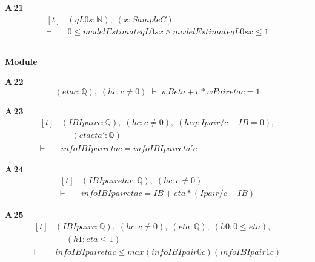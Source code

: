 \noindent\textbf{A\,21}\quad{}
{\footnotesize\[ \begin{aligned}[t]
&(\mathit{q} \mathit{L0} \mathit{s} : \mathbb{N} ),\; (\mathit{x} : \mathit{Sample} \mathit{C})\\
\vdash\;&0 \leq \mathit{modelEstimate} \mathit{q} \mathit{L0} \mathit{s} \mathit{x} \wedge \mathit{modelEstimate} \mathit{q} \mathit{L0} \mathit{s} \mathit{x} \leq 1
\end{aligned} \]}

\vspace{4pt}\noindent\rule{\columnwidth}{0.4pt}\par\vspace{2pt}
\noindent\textbf{Module }\par\vspace{3pt}

\noindent\textbf{A\,22}\quad{}
{\footnotesize\[ (\mathit{eta} \mathit{c} : \mathbb{Q} ),\; (\mathit{hc} : \mathit{c} \neq 0) \;\vdash\; \mathit{wB} \mathit{eta} + \mathit{c} * \mathit{wPair} \mathit{eta} \mathit{c} = 1 \]}

\noindent\textbf{A\,23}\quad{}
{\footnotesize\[ \begin{aligned}[t]
&(\mathit{IB} \mathit{Ipair} \mathit{c} : \mathbb{Q} ),\; (\mathit{hc} : \mathit{c} \neq 0),\; (\mathit{heq} : \mathit{Ipair} / \mathit{c} - \mathit{IB} = 0),\\
&\quad \; (\mathit{eta} \mathit{eta'} : \mathbb{Q} )\\
\vdash\;&\mathit{info} \mathit{IB} \mathit{Ipair} \mathit{eta} \mathit{c} = \mathit{info} \mathit{IB} \mathit{Ipair} \mathit{eta'} \mathit{c}
\end{aligned} \]}

\noindent\textbf{A\,24}\quad{}
{\footnotesize\[ \begin{aligned}[t]
&(\mathit{IB} \mathit{Ipair} \mathit{eta} \mathit{c} : \mathbb{Q} ),\; (\mathit{hc} : \mathit{c} \neq 0)\\
\vdash\;&\mathit{info} \mathit{IB} \mathit{Ipair} \mathit{eta} \mathit{c} = \mathit{IB} + \mathit{eta} * (\mathit{Ipair} / \mathit{c} - \mathit{IB})
\end{aligned} \]}

\noindent\textbf{A\,25}\quad{}
{\footnotesize\[ \begin{aligned}[t]
&(\mathit{IB} \mathit{Ipair} \mathit{c} : \mathbb{Q} ),\; (\mathit{hc} : \mathit{c} \neq 0),\; (\mathit{eta} : \mathbb{Q} ),\; (\mathit{h0} : 0 \leq \mathit{eta}),\\
&\quad \; (\mathit{h1} : \mathit{eta} \leq 1)\\
\vdash\;&\mathit{info} \mathit{IB} \mathit{Ipair} \mathit{eta} \mathit{c} \leq \mathit{max} (\mathit{info} \mathit{IB} \mathit{Ipair} 0 \mathit{c}) (\mathit{info} \mathit{IB} \mathit{Ipair} 1 \mathit{c})
\end{aligned} \]}

